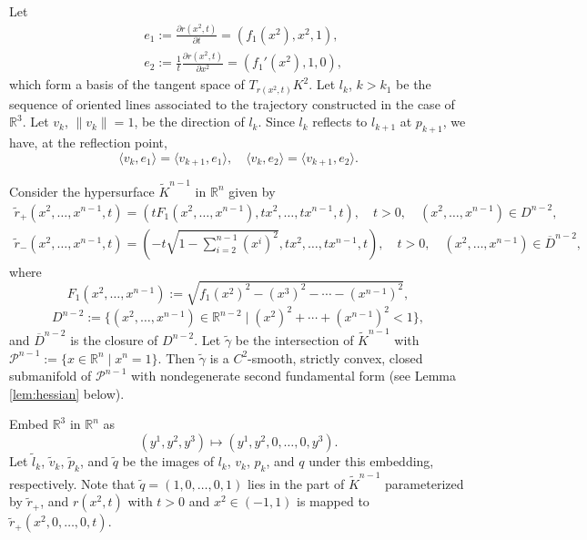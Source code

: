\documentclass[12pt]{article}
\begin{document}
Let  
$$
\begin{aligned}
  & e_1 := \frac{\partial r(x^2, t)}{\partial t} = (f_1(x^2), x^2, 1),\\
 & e_2 := \frac{1}{t} \frac{\partial r(x^2, t)}{\partial x^2} = (f_1'(x^2), 1, 0),
\end{aligned}
$$  
which form a basis of the tangent space of $T_{r(x^2,t)}K^2$.  
Let $l_k$, $k>k_1$ be the sequence of oriented lines associated to the trajectory constructed in the case of $\mathbb{R}^3$.
Let ${v}_{k}$, $\|{v}_{k}\| = 1$, be the direction of $l_k$.  
Since $l_k$ reflects to $l_{k+1}$ at $p_{k+1}$,  
we have, at the reflection point,  
\begin{equation}\label{eq:eofvinr3}
  \langle {{v}}_{k}, e_1 \rangle = \langle {{v}}_{k+1}, e_1 \rangle, 
\quad
\langle {{v}}_{k}, e_2 \rangle = \langle {{v}}_{k+1}, e_2 \rangle.
\end{equation}

Consider the hypersurface $\tilde{K}^{n-1}$ in $\mathbb{R}^n$ given by  
\begin{equation}\label{eq:rtilde}
  \begin{aligned}
    \tilde{r}_+(x^2, \ldots, x^{n-1}, t) = (t F_1(x^2, \ldots, x^{n-1}), t x^2, \ldots, t x^{n-1}, t),
\quad  
t>0,
\quad
(x^2, \ldots, x^{n-1}) \in D^{n-2}, \\
\tilde{r}_-(x^2, \ldots, x^{n-1}, t) = (-t \sqrt{1- \sum_{i=2}^{n-1}(x^i)^2}, t x^2, \ldots, t x^{n-1}, t),
\quad  
t>0,
\quad  
(x^2, \ldots, x^{n-1}) \in \overline {D}^{n-2},  
  \end{aligned}
\end{equation} 
where  
$$
F_1(x^2, \ldots, x^{n-1}) := \sqrt{f_1(x^2)^2 - (x^3)^2 - \cdots - (x^{n-1})^2},
$$  
$$
D^{n-2} := \{(x^2, \ldots, x^{n-1}) \in \mathbb{R}^{n-2} \mid (x^2)^2 + \cdots + (x^{n-1})^2 < 1\},$$ 
and $\overline {D}^{n-2}$ is the closure of $D^{n-2}$. Let $\tilde{\gamma}$ be the intersection of $\tilde{K}^{n-1}$ with $\mathcal{P}^{n-1}:=\{x \in \mathbb{R}^n \mid x^n = 1\}$. Then 
$\tilde{\gamma}$ is a $C^2$-smooth, strictly convex, closed submanifold of $\mathcal{P}^{n-1}$ with nondegenerate second fundamental form (see Lemma \ref{lem:hessian} below). 

Embed $\mathbb{R}^3$ in $\mathbb{R}^n$ as  
$$
(y^1, y^2, y^3) \mapsto (y^1, y^2, 0, \ldots, 0, y^3).
$$  
Let $\tilde{l}_k$, $\tilde{{v}}_{k}$, $\tilde{p}_k$, and $\tilde{q}$ be the images of $l_k$, ${{v}}_{k}$, $p_k$, and $q$  
under this embedding, respectively.  
Note that $\tilde{q}=(1,0, \ldots, 0, 1)$ lies in the part of $\tilde{K}^{n-1}$ parameterized by $\tilde{r}_+$, and $r(x^2, t)$ with $t>0$ and $x^2 \in (-1,1)$ is mapped to $\tilde{r}_+(x^2,0,\ldots, 0,t)$.
\end{document}

